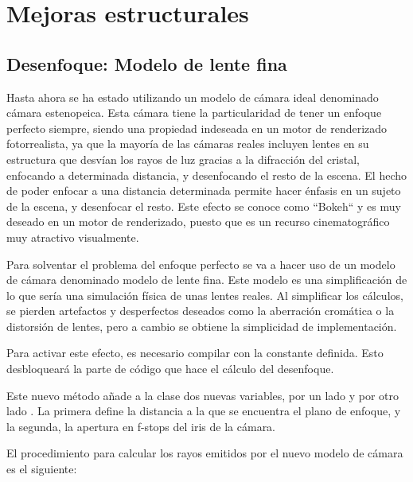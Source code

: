 \chapter{Mejoras estructurales}
				
	
	\section{Desenfoque: Modelo de lente fina}
	
	Hasta ahora se ha estado utilizando un modelo de cámara ideal denominado cámara estenopeica. Esta cámara tiene la particularidad de tener un enfoque perfecto siempre, siendo una propiedad indeseada en un motor de renderizado fotorrealista, ya que la mayoría de las cámaras reales incluyen lentes en su estructura que desvían los rayos de luz gracias a la difracción del cristal, enfocando a determinada distancia, y desenfocando el resto de la escena. El hecho de poder enfocar a una distancia determinada permite hacer énfasis en un sujeto de la escena, y desenfocar el resto. Este efecto se conoce como ``Bokeh`` y es muy deseado en un motor de renderizado, puesto que es un recurso cinematográfico muy atractivo visualmente.

	Para solventar el problema del enfoque perfecto se va a hacer uso de un modelo de cámara denominado modelo de lente fina. Este modelo es una simplificación de lo que sería una simulación física de unas lentes reales. Al simplificar los cálculos, se pierden artefactos y desperfectos deseados como la aberración cromática o la distorsión de lentes, pero a cambio se obtiene la simplicidad de implementación.

	Para activar este efecto, es necesario compilar con la constante  definida. Esto desbloqueará la parte de código que hace el cálculo del desenfoque. 
	
	Este nuevo método añade a la clase  dos nuevas variables, por un lado  y por otro lado . La primera define la distancia a la que se encuentra el plano de enfoque, y la segunda, la apertura en f-stops del iris de la cámara. 

	El procedimiento para calcular los rayos emitidos por el nuevo modelo de cámara es el siguiente:

